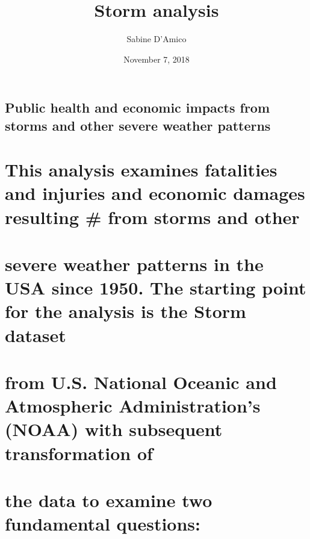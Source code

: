 \documentclass[]{article}
\title{Storm analysis}
\author{Sabine D'Amico}
\date{November 7, 2018}
\begin{document}
\maketitle

\hypertarget{public-health-and-economic-impacts-from-storms-and-other-severe-weather-patterns}{%
\subsection{Public health and economic impacts from storms and other
severe weather
patterns}\label{public-health-and-economic-impacts-from-storms-and-other-severe-weather-patterns}}

\hypertarget{this-analysis-examines-fatalities-and-injuries-and-economic-damages-resulting-from-storms-and-other}{%
\section{This analysis examines fatalities and injuries and economic
damages resulting \# from storms and
other}\label{this-analysis-examines-fatalities-and-injuries-and-economic-damages-resulting-from-storms-and-other}}

\hypertarget{severe-weather-patterns-in-the-usa-since-1950.-the-starting-point-for-the-analysis-is-the-storm-dataset}{%
\section{severe weather patterns in the USA since 1950. The starting
point for the analysis is the Storm
dataset}\label{severe-weather-patterns-in-the-usa-since-1950.-the-starting-point-for-the-analysis-is-the-storm-dataset}}

\hypertarget{from-u.s.-national-oceanic-and-atmospheric-administrations-noaa-with-subsequent-transformation-of}{%
\section{from U.S. National Oceanic and Atmospheric Administration's
(NOAA) with subsequent transformation
of}\label{from-u.s.-national-oceanic-and-atmospheric-administrations-noaa-with-subsequent-transformation-of}}

\hypertarget{the-data-to-examine-two-fundamental-questions}{%
\section{the data to examine two fundamental
questions:}\label{the-data-to-examine-two-fundamental-questions}}
\end{document}

